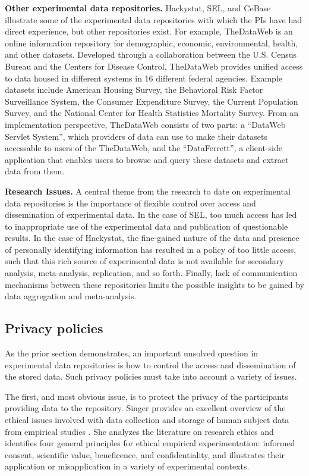 {\bf Other experimental data repositories.}  Hackystat, SEL, and CeBase
illustrate some of the experimental data repositories with which the PIs
have had direct experience, but other repositories exist.  For example,
TheDataWeb is an online information repository for demographic, economic,
environmental, health, and other datasets.  Developed through a
collaboration between the U.S. Census Bureau and the Centers for Disease
Control, TheDataWeb provides unified access to data housed in different
systems in 16 different federal agencies. Example datasets include American
Housing Survey, the Behavioral Risk Factor Surveillance System, the
Consumer Expenditure Survey, the Current Population Survey, and the
National Center for Health Statistics Mortality Survey.  From an
implementation perspective, TheDataWeb consists of two parts: a ``DataWeb
Servlet System'', which providers of data can use to make their datasets
accessable to users of the TheDataWeb, and the ``DataFerrett'', a
client-side application that enables users to browse and query these
datasets and extract data from them.

{\bf Research Issues.}  A central theme from the research to date on
experimental data repositories is the importance of flexible control over
access and dissemination of experimental data.  In the case of SEL, too
much access has led to inappropriate use of the experimental data and
publication of questionable results.  In the case of Hackystat, the
fine-gained nature of the data and presence of personally identifying
information has resulted in a policy of too little access, such that this
rich source of experimental data is not available for secondary analysis,
meta-analysis, replication, and so forth.  Finally, lack of communication
mechanisms between these repositories limits the possible insights to be 
gained by data aggregation and meta-analysis.

\subsection{Privacy policies}
\label{sec:privacy}

As the prior section demonstrates, an important unsolved question in
experimental data repositories is how to control the access and
dissemination of the stored data.  Such privacy policies must take into
account a variety of issues. 

The first, and most obvious issue, is to protect the privacy of the
participants providing data to the repository.  Singer provides an
excellent overview of the ethical issues involved with data collection and
storage of human subject data from empirical studies \cite{Singer02}.  She
analyzes the literature on research ethics and identifies four general
principles for ethical empirical experimentation: informed consent,
scientific value, beneficence, and confidentiality, and illustrates their
application or misapplication in a variety of experimental contexts.


